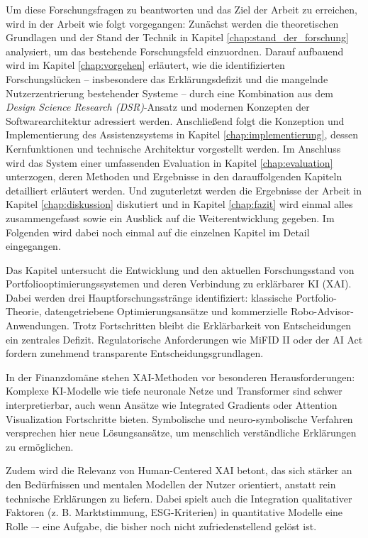 Um diese Forschungsfragen zu beantworten und das Ziel der Arbeit zu erreichen, wird in der Arbeit wie folgt vorgegangen:
Zunächst werden die theoretischen Grundlagen und der Stand der Technik in Kapitel \ref{chap:stand_der_forschung} analysiert, um das bestehende Forschungsfeld einzuordnen.
Darauf aufbauend wird im Kapitel \ref{chap:vorgehen} erläutert, wie die identifizierten Forschungslücken -- insbesondere das Erklärungsdefizit und die mangelnde Nutzerzentrierung bestehender Systeme -- durch eine Kombination aus dem \textit{Design Science Research (\acs{DSR})}-Ansatz und modernen Konzepten der Softwarearchitektur adressiert werden.
Anschließend folgt die Konzeption und Implementierung des Assistenzsystems in Kapitel \ref{chap:implementierung}, dessen Kernfunktionen und technische Architektur vorgestellt werden.
Im Anschluss wird das System einer umfassenden Evaluation in Kapitel \ref{chap:evaluation} unterzogen, deren Methoden und Ergebnisse in den darauffolgenden Kapiteln detailliert erläutert werden.
Und zuguterletzt werden die Ergebnisse der Arbeit in Kapitel \ref{chap:diskussion} diskutiert und in Kapitel \ref{chap:fazit} wird einmal alles zusammengefasst sowie ein Ausblick auf die Weiterentwicklung gegeben.
Im Folgenden wird dabei noch einmal auf die einzelnen Kapitel im Detail eingegangen.


Das Kapitel \textbf{} untersucht die Entwicklung und den aktuellen Forschungsstand von Portfoliooptimierungssystemen und deren Verbindung zu erklärbarer \acs{KI} (\acs{XAI}).
Dabei werden drei Hauptforschungsstränge identifiziert: klassische Portfolio-Theorie, datengetriebene Optimierungsansätze und kommerzielle Robo-Advisor-Anwendungen.
Trotz Fortschritten bleibt die Erklärbarkeit von Entscheidungen ein zentrales Defizit.
Regulatorische Anforderungen wie MiFID II oder der AI Act fordern zunehmend transparente Entscheidungsgrundlagen.

In der Finanzdomäne stehen \acs{XAI}-Methoden vor besonderen Herausforderungen:
Komplexe \acs{KI}-Modelle wie tiefe neuronale Netze und Transformer sind schwer interpretierbar, auch wenn Ansätze wie Integrated Gradients oder Attention Visualization Fortschritte bieten.
Symbolische und neuro-symbolische Verfahren versprechen hier neue Lösungsansätze, um menschlich verständliche Erklärungen zu ermöglichen.

Zudem wird die Relevanz von Human-Centered \acs{XAI} betont, das sich stärker an den Bedürfnissen und mentalen Modellen der Nutzer orientiert, anstatt rein technische Erklärungen zu liefern.
Dabei spielt auch die Integration qualitativer Faktoren (z. B. Marktstimmung, \acs{ESG}-Kriterien) in quantitative Modelle eine Rolle –- eine Aufgabe, die bisher noch nicht zufriedenstellend gelöst ist.

